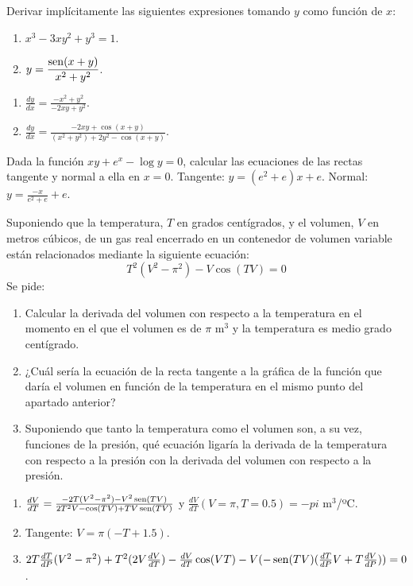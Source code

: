 
{Derivar implícitamente las siguientes expresiones tomando $y$ como función de $x$:
\begin{multicols}{2}
\begin{enumerate}
\item $x^3-3xy^2+y^3=1$.
\item $y=\dfrac{\operatorname{sen}(x+y)}{x^2+y^2}$.
\end{enumerate}
\end{multicols}
}
{\begin{enumerate}
\item $\frac{dy}{dx}=\frac{-x^2+y^2}{-2xy+y^2}.$
\item $\frac{dy}{dx}=\frac{-2xy+\cos(x+y)}{(x^2+y^2)+2y^2-\cos(x+y)}.$
\end{enumerate}
}
{
}


{Dada la función $xy+e^x-\log y=0$, calcular las ecuaciones de las rectas tangente y normal a ella en $x=0$.
}
{Tangente: $y=(e^2+e)x+e$. Normal: $y=\frac{-x}{e^2+e}+e$.
}
{
}


{Suponiendo que la temperatura, $T$ en grados centígrados, y el volumen, $V$ en metros cúbicos, de un gas real encerrado en un contenedor de volumen variable están relacionados mediante la siguiente ecuación:
\[
T^2 \left( {V^2  - \pi ^2 } \right) - V\cos \left( {TV} \right) = 0
\]
Se pide:
\begin{enumerate}
\item Calcular la derivada del volumen con respecto a la temperatura en el momento en el que el volumen es de $\pi$ m$^3$ y la temperatura es medio grado centígrado.

\item ¿Cuál sería la ecuación de la recta tangente a la gráfica de la función que daría el volumen en función de la temperatura en el mismo punto del apartado anterior?
\item Suponiendo que tanto la temperatura como el volumen son, a su vez, funciones de la presión, qué ecuación ligaría la derivada de la temperatura con respecto a la presión con la derivada del volumen con respecto a la presión.
\end{enumerate}
}
{\begin{enumerate}
\item $\frac{dV}{dT} = \frac{-2T(V^2-\pi^2)-V^2\operatorname{sen}(TV)}{2T^2V-\cos(TV)+TV\operatorname{sen}(TV)}$ y $\frac{dV}{dT}(V=\pi,T=0.5)= -pi$ m$^3$/ºC.
\item Tangente: $V=\pi(-T+1.5)$.
\item $2T\frac{dT}{dP}(V^2-\pi^2)+T^2(2V\frac{dV}{dT})-\frac{dV}{dT}\cos(VT)-V(-\operatorname{sen}(TV)(\frac{dT}{dP}V+T\frac{dV}{dP})) =0$.
\end{enumerate}
}
{
}



